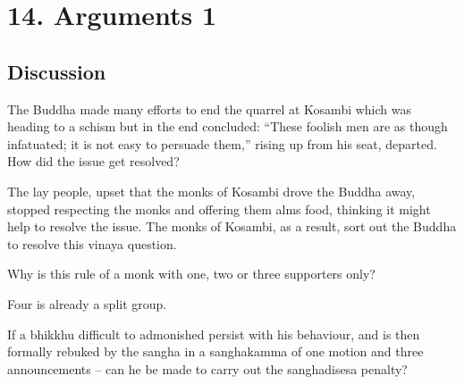 \chapter{14. Arguments 1}
\renewcommand*{\theChapterTitle}{14. Arguments 1}

\section*{Discussion}


The Buddha made many efforts to end the quarrel at Kosambi which was heading to
a schism but in the end concluded: “These foolish men are as though infatuated;
it is not easy to persuade them,” rising up from his seat, departed. How did the
issue get resolved?

\bigskip

\begin{solution}
  The lay people, upset that the monks of Kosambi drove the Buddha away,
  stopped respecting the monks and offering them alms food, thinking it might
  help to resolve the issue. The monks of Kosambi, as a result, sort out the
  Buddha to resolve this vinaya question.
\end{solution}


Why is this rule of a monk with one, two or three supporters only?

\bigskip

\begin{solution}
  Four is already a split group.
\end{solution}


If a bhikkhu difficult to admonished persist with his behaviour, and is then
formally rebuked by the sangha in a sanghakamma of one motion and three
announcements – can he be made to carry out the sanghadisesa penalty?

